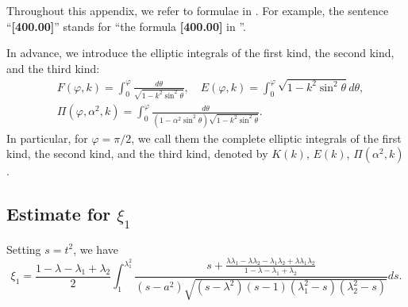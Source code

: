 \documentclass[11pt]{amsart}
\numberwithin{equation}{section}
\numberwithin{figure}{section}
\theoremstyle{plain} %
\theoremstyle{definition} %
\begin{document}
Throughout this appendix, we refer to formulae in \cite{bf}.  
For example, the sentence ``\textbf{[400.00]}'' stands for ``the formula \textbf{[400.00]} in \cite{bf}''. 

In advance, we introduce the elliptic integrals of the first kind, the second kind, and the third kind: 
\begin{align*}
& F (\varphi, k) =\int_0^{\varphi} \frac{d\theta}{\sqrt{1-k^2\sin^2\theta}}, \quad 
E(\varphi, k) = \int_0^{\varphi} \sqrt{1-k^2\sin^2\theta}d\theta, \\
& \Pi (\varphi, \alpha^2,k) = \int_0^{\varphi} \frac{d\theta}{(1-\alpha^2\sin^2\theta)\sqrt{1-k^2\sin^2\theta}}. 
\end{align*}
In particular, for $\varphi=\pi/2$, we call them the complete elliptic integrals of the first kind, 
the second kind, and the third kind, denoted by 
$K (k)$, $E (k)$, $\Pi (\alpha^2,k)$. 


\subsection{Estimate for $\xi_1$}

Setting $s=t^2$, we have  
\[
\xi_1 
= \frac{1-\lambda-\lambda_1+\lambda_2}{2} \int_1^{\lambda_1^2} \frac{s+\frac{\lambda\lambda_1-\lambda\lambda_2-\lambda_1\lambda_2+\lambda\lambda_1\lambda_2}{1-\lambda-\lambda_1+\lambda_2} }{(s-a^2)\sqrt{(s-\lambda^2)(s-1)(\lambda_1^2-s)(\lambda_2^2-s)}}ds. 
\]
\end{document}

